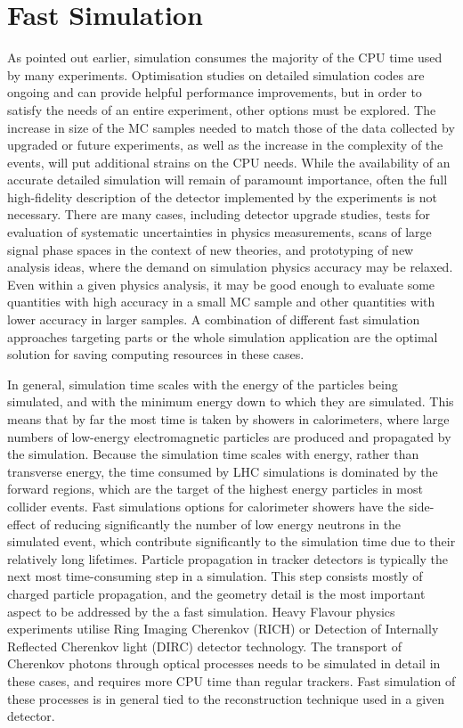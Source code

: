 \documentclass[12pt,a4paper]{article}
\begin{document}
{\hypertarget{fast-simulation}{%
\section{Fast Simulation}\label{fast-simulation}}

As pointed out earlier, simulation consumes the majority of the CPU time
used by many experiments. Optimisation studies on detailed simulation
codes are ongoing and can provide helpful performance improvements, but
in order to satisfy the needs of an entire experiment, other options
must be explored. The increase in size of the MC samples needed to match
those of the data collected by upgraded or future experiments, as well
as the increase in the complexity of the events, will put additional
strains on the CPU needs. While the availability of an accurate detailed
simulation will remain of paramount importance, often the full
high-fidelity description of the detector implemented by the experiments
is not necessary. There are many cases, including detector upgrade
studies, tests for evaluation of systematic uncertainties in physics
measurements, scans of large signal phase spaces in the context of new
theories, and prototyping of new analysis ideas, where the demand on
simulation physics accuracy may be relaxed. Even within a given physics
analysis, it may be good enough to evaluate some quantities with high
accuracy in a small MC sample and other quantities with lower accuracy
in larger samples. A combination of different fast simulation approaches
targeting parts or the whole simulation application are the optimal
solution for saving computing resources in these cases.

In general, simulation time scales with the energy of the particles
being simulated, and with the minimum energy down to which they are
simulated. This means that by far the most time is taken by showers in
calorimeters, where large numbers of low-energy electromagnetic
particles are produced and propagated by the simulation. Because the
simulation time scales with energy, rather than transverse energy, the
time consumed by LHC simulations is dominated by the forward regions,
which are the target of the highest energy particles in most collider
events. Fast simulations options for calorimeter showers have the
side-effect of reducing significantly the number of low energy neutrons
in the simulated event, which contribute significantly to the simulation
time due to their relatively long lifetimes. Particle propagation in
tracker detectors is typically the next most time-consuming step in a
simulation. This step consists mostly of charged particle propagation,
and the geometry detail is the most important aspect to be addressed by
the a fast simulation. Heavy Flavour physics experiments utilise Ring
Imaging Cherenkov (RICH) or Detection of Internally Reflected Cherenkov
light (DIRC) detector technology. The transport of Cherenkov photons
through optical processes needs to be simulated in detail in these
cases, and requires more CPU time than regular trackers. Fast simulation
of these processes is in general tied to the reconstruction technique
used in a given detector.

}
\end{document}
